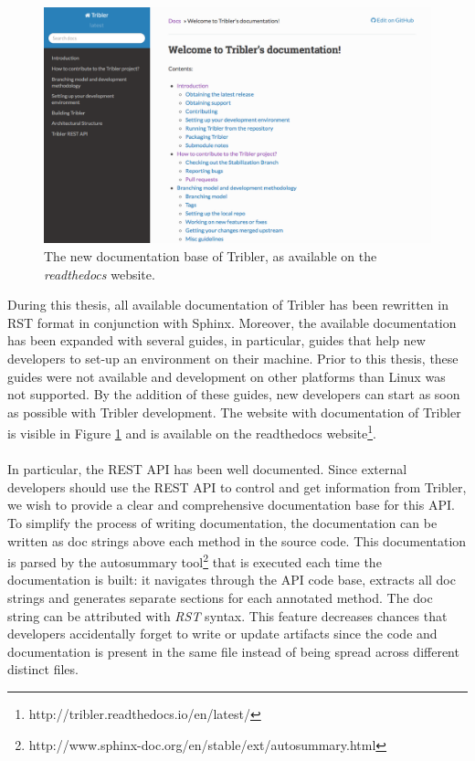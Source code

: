 \begin{figure}[h!]
	\centering
	\includegraphics[width=1.0\columnwidth]{images/improving_qa/readthedocs}
	\caption{The new documentation base of Tribler, as available on the \emph{readthedocs} website.}
	\label{fig:documentation-tribler}
\end{figure}

During this thesis, all available documentation of Tribler has been rewritten in RST format in conjunction with Sphinx. Moreover, the available documentation has been expanded with several guides, in particular, guides that help new developers to set-up an environment on their machine. Prior to this thesis, these guides were not available and development on other platforms than Linux was not supported. By the addition of these guides, new developers can start as soon as possible with Tribler development. The website with documentation of Tribler is visible in Figure \ref{fig:documentation-tribler} and is available on the readthedocs website\footnote{http://tribler.readthedocs.io/en/latest/}.\\\\
In particular, the REST API has been well documented. Since external developers should use the REST API to control and get information from Tribler, we wish to provide a clear and comprehensive documentation base for this API. To simplify the process of writing documentation, the documentation can be written as doc strings above each method in the source code. This documentation is parsed by the autosummary tool\footnote{http://www.sphinx-doc.org/en/stable/ext/autosummary.html} that is executed each time the documentation is built: it navigates through the API code base, extracts all doc strings and generates separate sections for each annotated method. The doc string can be attributed with \emph{RST} syntax. This feature decreases chances that developers accidentally forget to write or update artifacts since the code and documentation is present in the same file instead of being spread across different distinct files.

